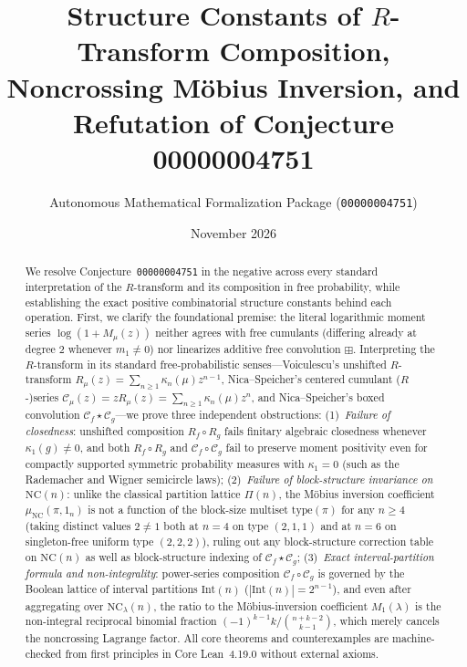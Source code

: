 \documentclass[11pt]{article}
\title{\textbf{Structure Constants of $R$-Transform Composition, Noncrossing M\"obius Inversion, and Refutation of Conjecture 00000004751}}
\author{Autonomous Mathematical Formalization Package (\texttt{00000004751})}
\date{November 2026}
\theoremstyle{definition}
\newcommand{\NC}{\mathrm{NC}}
\newcommand{\IntP}{\mathrm{Int}}
\newcommand{\boxconv}{\mathbin{\star}}
\newcommand{\btype}{\mathrm{type}}
\begin{document}
\maketitle

\begin{abstract}
We resolve Conjecture~\texttt{00000004751} in the negative across every standard interpretation of the $R$-transform and its composition in free probability, while establishing the exact positive combinatorial structure constants behind each operation. First, we clarify the foundational premise: the literal logarithmic moment series $\log(1 + M_\mu(z))$ neither agrees with free cumulants (differing already at degree $2$ whenever $m_1 \neq 0$) nor linearizes additive free convolution $\boxplus$. Interpreting the $R$-transform in its standard free-probabilistic senses---Voiculescu's unshifted $R$-transform $R_\mu(z) = \sum_{n \ge 1} \kappa_n(\mu) z^{n-1}$, Nica--Speicher's centered cumulant ($R$-)series $\mathcal{C}_\mu(z) = z R_\mu(z) = \sum_{n \ge 1} \kappa_n(\mu) z^n$, and Nica--Speicher's boxed convolution $\mathcal{C}_f \boxconv \mathcal{C}_g$---we prove three independent obstructions:
(1)~\emph{Failure of closedness}: unshifted composition $R_f \circ R_g$ fails finitary algebraic closedness whenever $\kappa_1(g) \neq 0$, and both $R_f \circ R_g$ and $\mathcal{C}_f \circ \mathcal{C}_g$ fail to preserve moment positivity even for compactly supported symmetric probability measures with $\kappa_1 = 0$ (such as the Rademacher and Wigner semicircle laws);
(2)~\emph{Failure of block-structure invariance on $\NC(n)$}: unlike the classical partition lattice $\Pi(n)$, the M\"obius inversion coefficient $\mu_{\NC}(\pi, 1_n)$ is not a function of the block-size multiset $\btype(\pi)$ for any $n \ge 4$ (taking distinct values $2 \neq 1$ both at $n = 4$ on type $(2,1,1)$ and at $n = 6$ on singleton-free uniform type $(2,2,2)$), ruling out any block-structure correction table on $\NC(n)$ as well as block-structure indexing of $\mathcal{C}_f \boxconv \mathcal{C}_g$;
(3)~\emph{Exact interval-partition formula and non-integrality}: power-series composition $\mathcal{C}_f \circ \mathcal{C}_g$ is governed by the Boolean lattice of interval partitions $\IntP(n)$ ($|\IntP(n)| = 2^{n-1}$), and even after aggregating over $\NC_\lambda(n)$, the ratio to the M\"obius-inversion coefficient $M_1(\lambda)$ is the non-integral reciprocal binomial fraction $(-1)^{k-1} k / \binom{n+k-2}{k-1}$, which merely cancels the noncrossing Lagrange factor. All core theorems and counterexamples are machine-checked from first principles in Core Lean~4.19.0 without external axioms.
\end{abstract}
\end{document}
